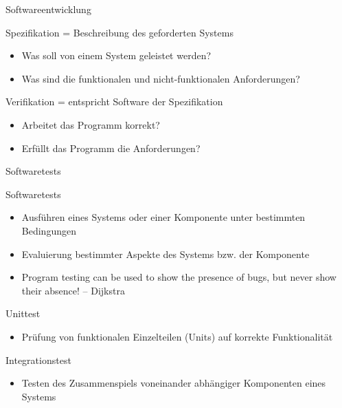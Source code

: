 \documentclass{beamer}
\begin{document}
\begin{frame}{Softwareentwicklung}
	\begin{block}{Spezifikation}
		= Beschreibung des geforderten Systems
		\begin{itemize}
			\item Was soll von einem System geleistet werden?
			\item Was sind die funktionalen und nicht-funktionalen Anforderungen?
		\end{itemize}
	\end{block}
	\begin{block}{Verifikation}
		= entspricht Software der Spezifikation	
		\begin{itemize}
			\item Arbeitet das Programm korrekt?
			\item Erfüllt das Programm die Anforderungen?
		\end{itemize}
	\end{block}
\end{frame}

\begin{frame}{Softwaretests}
	\begin{block}{Softwaretests}
		\begin{itemize}
			\item Ausführen eines Systems oder einer Komponente unter bestimmten Bedingungen
			\item Evaluierung bestimmter Aspekte des Systems bzw. der Komponente
			\item {}Program testing can be used to show the presence of bugs, but never show their absence! -- Dijkstra
		\end{itemize}
	\end{block}
	\pause
	\begin{block}{Unittest}
		\begin{itemize}
			\item Prüfung von funktionalen Einzelteilen (Units) auf korrekte Funktionalität
		\end{itemize}
	\end{block}
	\begin{block}{Integrationstest}
		\begin{itemize}
			\item Testen des Zusammenspiels voneinander abhängiger Komponenten eines Systems
		\end{itemize}
	\end{block}
\end{frame}
\end{document}
